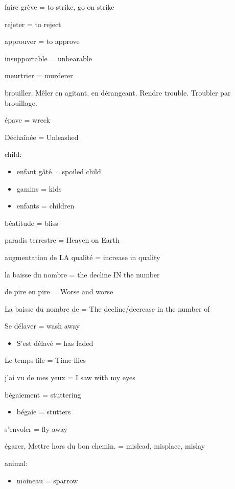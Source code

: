 faire grève = to strike, go on strike

rejeter = to reject

approuver = to approve

insupportable = unbearable

meurtrier = murderer

brouiller, Mêler en agitant, en dérangeant. Rendre trouble. Troubler par
brouillage.

épave = wreck

Déchaînée = Unleashed

child:

\begin{itemize}
\item
  enfant gâté = spoiled child
\item
  gamins = kids
\item
  enfants = children
\end{itemize}

béatitude = bliss

paradis terrestre = Heaven on Earth

augmentation de LA qualité = increase in quality~

la baisse du nombre = the decline IN the number

de pire en pire = Worse and worse

La baisse du nombre de = The decline/decrease in the number of

Se délaver = wash away

\begin{itemize}
\item
  S'est délavé = has faded
\end{itemize}

Le temps file = Time flies

j'ai vu de mes yeux = I saw with my eyes

bégaiement = stuttering

\begin{itemize}
\item
  bégaie = stutters
\end{itemize}

s'envoler = fly away

égarer, Mettre hors du bon chemin. = mislead, misplace, mislay

animal:

\begin{itemize}
\item
  moineau = sparrow
\end{itemize}

